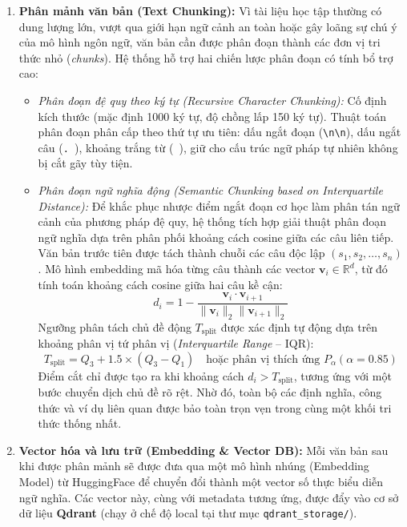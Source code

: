 ﻿\documentclass[12pt]{article}
\begin{document}
\begin{enumerate}
    \item \textbf{Phân mảnh văn bản (Text Chunking):} Vì tài liệu học tập thường có dung lượng lớn, vượt qua giới hạn ngữ cảnh an toàn hoặc gây loãng sự chú ý của mô hình ngôn ngữ, văn bản cần được phân đoạn thành các đơn vị tri thức nhỏ (\textit{chunks}). Hệ thống hỗ trợ hai chiến lược phân đoạn có tính bổ trợ cao:
    \begin{itemize}
        \item \textit{Phân đoạn đệ quy theo ký tự (Recursive Character Chunking):} Cố định kích thước (mặc định 1000 ký tự, độ chồng lấp 150 ký tự). Thuật toán phân đoạn phân cấp theo thứ tự ưu tiên: dấu ngắt đoạn (\texttt{\textbackslash n\textbackslash n}), dấu ngắt câu (\texttt{.\ }), khoảng trắng từ (\texttt{\ }), giữ cho cấu trúc ngữ pháp tự nhiên không bị cắt gãy tùy tiện.
        \item \textit{Phân đoạn ngữ nghĩa động (Semantic Chunking based on Interquartile Distance):} Để khắc phục nhược điểm ngắt đoạn cơ học làm phân tán ngữ cảnh của phương pháp đệ quy, hệ thống tích hợp giải thuật phân đoạn ngữ nghĩa dựa trên phân phối khoảng cách cosine giữa các câu liên tiếp. Văn bản trước tiên được tách thành chuỗi các câu độc lập $(s_1, s_2, \dots, s_n)$. Mô hình embedding mã hóa từng câu thành các vector $\mathbf{v}_i \in \mathbb{R}^d$, từ đó tính toán khoảng cách cosine giữa hai câu kề cận:
        \begin{equation}
            d_i = 1 - \frac{\mathbf{v}_i \cdot \mathbf{v}_{i+1}}{\|\mathbf{v}_i\|_2 \|\mathbf{v}_{i+1}\|_2}
        \end{equation}
        Ngưỡng phân tách chủ đề động $T_{\text{split}}$ được xác định tự động dựa trên khoảng phân vị tứ phân vị (\textit{Interquartile Range} -- IQR):
        \begin{equation}
            T_{\text{split}} = Q_3 + 1.5 \times (Q_3 - Q_1) \quad \text{hoặc phân vị thích ứng } P_{\alpha} (\alpha = 0.85)
        \end{equation}
        Điểm cắt chỉ được tạo ra khi khoảng cách $d_i > T_{\text{split}}$, tương ứng với một bước chuyển dịch chủ đề rõ rệt. Nhờ đó, toàn bộ các định nghĩa, công thức và ví dụ liên quan được bảo toàn trọn vẹn trong cùng một khối tri thức thống nhất.
    \end{itemize}
    
    \item \textbf{Vector hóa và lưu trữ (Embedding \& Vector DB):} Mỗi văn bản sau khi được phân mảnh sẽ được đưa qua một mô hình nhúng (Embedding Model) từ HuggingFace để chuyển đổi thành một vector số thực biểu diễn ngữ nghĩa. Các vector này, cùng với metadata tương ứng, được đẩy vào cơ sở dữ liệu \textbf{Qdrant} (chạy ở chế độ local tại thư mục \texttt{qdrant\_storage/}). 
\end{enumerate}
\end{document}
